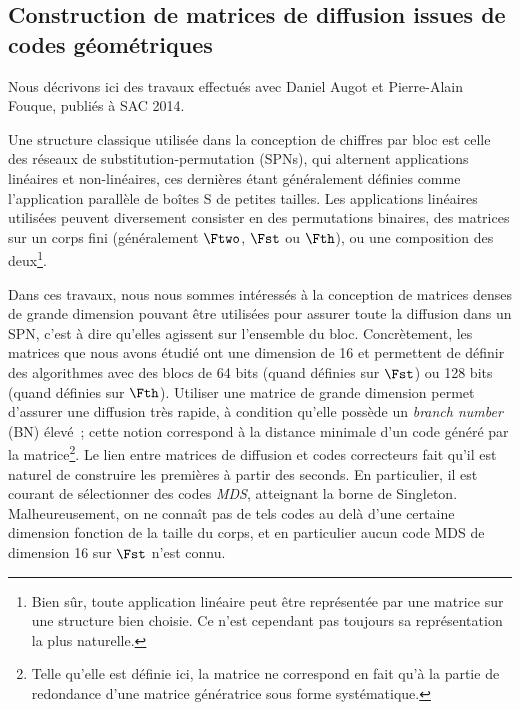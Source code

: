 \subsection[{Construction de matrices de diffusion issues de codes géométriques \cite{DBLP:conf/sacrypt/AugotFK14}}]{Construction de matrices de diffusion issues de codes géométriques~\cite{DBLP:conf/sacrypt/AugotFK14}}

Nous décrivons ici des travaux effectués avec Daniel Augot et Pierre-Alain Fouque, publiés à SAC 2014.

\medskip

Une structure classique utilisée dans la conception de chiffres par bloc est celle des réseaux de substitution-permutation (SPNs),
qui alternent applications linéaires et non-linéaires, ces dernières étant
généralement définies comme l'application parallèle de boîtes S de petites tailles. Les applications linéaires utilisées peuvent diversement consister en des permutations binaires, des matrices sur
un corps fini (généralement $\Ftwo$, $\Fst$ ou $\Fth$), ou une composition des deux\footnote{Bien sûr, toute application linéaire peut être représentée par une matrice sur une structure bien choisie. Ce n'est
cependant pas toujours sa représentation la plus naturelle.}.

Dans ces travaux, nous nous sommes intéressés à la conception de matrices denses
de grande dimension pouvant être utilisées pour assurer toute la diffusion dans un SPN, c'est à dire qu'elles agissent sur l'ensemble du bloc. Concrètement, les matrices que nous
avons étudié ont une dimension de 16
et permettent de définir des algorithmes avec des blocs de 64 bits (quand définies sur $\Fst$) ou 128 bits (quand définies sur $\Fth$).
Utiliser une matrice de grande dimension permet d'assurer une diffusion très rapide, à condition qu'elle possède un \emph{branch number} (BN) élevé~; cette notion correspond à la
distance minimale d'un code généré par la matrice\footnote{Telle qu'elle est définie ici, la matrice ne correspond en fait qu'à
la partie de redondance d'une matrice génératrice sous forme systématique.}.
Le lien entre matrices de diffusion et codes correcteurs fait qu'il est naturel de construire les premières à partir des seconds. En particulier, il est courant de sélectionner
des codes \emph{MDS}, atteignant la borne de Singleton. Malheureusement, on ne connaît pas de tels codes au delà d'une certaine dimension fonction de la taille du corps, et en particulier
aucun code MDS de dimension 16 sur $\Fst$ n'est connu.

